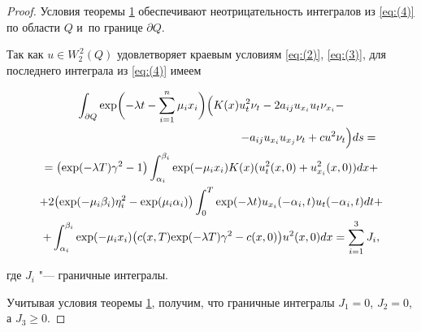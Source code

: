 \begin{proof}
Условия теоремы \hyperlink{dzh:th1}{1} обеспечивают   неотрицательность  интегралов из \eqref{eq:(4)} по области $Q$ и~по границе $\partial Q.$  

Так как  $u\in W_{2}^{\,2}(Q)$ удовлетворяет краевым условиям \eqref{eq:(2)}, \eqref{eq:(3)}, для последнего интеграла из \eqref{eq:(4)}  имеем

\begin{multline} 

\int _{\partial Q}

\exp \biggl(-\lambda t-\sum\limits_{i=1}^{n}{{{\mu }_{i}} {{x}_{i}}} \biggr)

\Bigl( 

K(x)u _{t}^{2} {{\nu }_{t}}-2{{a}_{ij}} {{u}_{{{x}_{i}}}} {{u}_{t}} {{\nu }_{{{x}_{i}}}} -\\

\hspace{6cm} -{{a}_{ij}}{{u}_{{{x}_{i}}}}{{u}_{{{x}_{j}}}} {{\nu }_{t}}+c{{u}^{2}} {{\nu }_{t}} \Bigr) ds = 

\\

=\bigl(\exp (-\lambda T){{\gamma }^{2}}-1\bigr)

\int _{{{\alpha }_{i}}}^{{{\beta }_{i}}} 

\exp (-{{\mu }_{i}}{{x}_{i}}) K(x) (u_{t}^{2}(x,0)+u_{{{x}_{i}}}^{2}(x,0))dx+ 

\\

+2

\bigl( \exp (-{{\mu }_{i}}{{\beta }_{i}}) 

{{\eta }_i^{2}}-\exp ({{\mu }_{i}}{{\alpha }_{i}}) \bigr)

\int_{0}^{T}{\exp (-\lambda t)} {{u}_{{{x}_{i}}}}(-\alpha_i, t){{u}_{t}}(-\alpha_i, t)dt+ 

\\

+\int_{{{\alpha }_{i}}}^{{{\beta }_{i}}}

\exp (-{{\mu }_{i}}{{x}_{i}}) \bigl( c(x,T){\exp({-\lambda T}}){{\gamma }^{2}}-c(x,0) \bigr) {u}^{2}(x,0)dx= 

\sum\limits_{i=1}^{3}{{{J}_{i}}}, 

\end{multline}

где ${{J}_{i}}$ "--- граничные интегралы. 



Учитывая условия теоремы \hyperlink{dzh:th1}{1}, получим,  что граничные интегралы ${J_1=0}$, ${{J}_{2}} =0$, а ${{J}_{3}} \ge 0.$


\end{proof}
